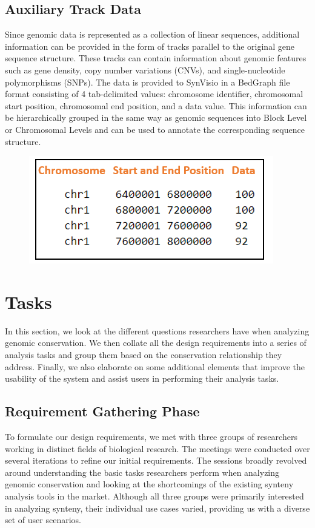 \subsection{Auxiliary Track Data}
Since genomic data is represented as a collection of linear sequences, additional information can be provided in the form of tracks parallel to the original gene sequence structure. These tracks can contain information about genomic features such as gene density, copy number variations (CNVs), and single-nucleotide polymorphisms (SNPs). The data is provided to SynVisio in a BedGraph file format consisting of 4 tab-delimited values: chromosome identifier, chromosomal start position, chromosomal end position, and a data value. This information can be hierarchically grouped in the same way as genomic sequences into Block Level or Chromosomal Levels and can be used to annotate the corresponding sequence structure. 

\begin{figure}
  \centering
  \includegraphics[width=.45\linewidth]{images/ch_3_track_file.PNG}
  \label{fig:ch_3_track_file}
\end{figure}

\section{Tasks}

In this section, we look at the different questions researchers have when analyzing genomic conservation. We then collate all the design requirements into a series of analysis tasks and group them based on the conservation relationship they address. Finally, we also elaborate on some additional elements that improve the usability of the system and assist users in performing their analysis tasks.

\subsection{Requirement Gathering Phase}
To formulate our design requirements, we met with three groups of researchers working in distinct fields of biological research. The meetings were conducted over several iterations to refine our initial requirements. The sessions broadly revolved around understanding the basic tasks researchers perform when analyzing genomic conservation and looking at the shortcomings of the existing synteny analysis tools in the market. Although all three groups were primarily interested in analyzing synteny, their individual use cases varied, providing us with a diverse set of user scenarios.

